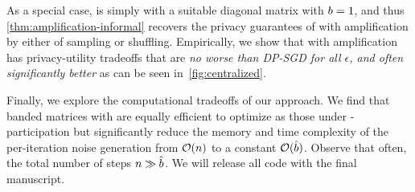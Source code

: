 \documentclass{article}
\begin{document}

As a special case,  \DPSGD is simply \MF with a suitable diagonal matrix with $b=1$, and thus \cref{thm:amplification-informal} recovers the privacy guarantees of \DPSGD with amplification by either of sampling or shuffling. Empirically, we show that \MF with amplification has privacy-utility tradeoffs that are \emph{no worse than DP-SGD for all $\epsilon$, and often significantly better} 
as can be seen in~\cref{fig:centralized}. 

Finally, we explore the computational tradeoffs of our approach. We find that banded matrices with \bparticipation are equally efficient to optimize as those under \multiepoch-participation but significantly reduce the memory and time complexity of the per-iteration noise generation from $\mathcal{O}(n)$ to a constant $\mathcal{O}(\hat{b})$. Observe that often, the total number of steps $n \gg \hat{b}$. We will release all code with the final manuscript.


\end{document}
